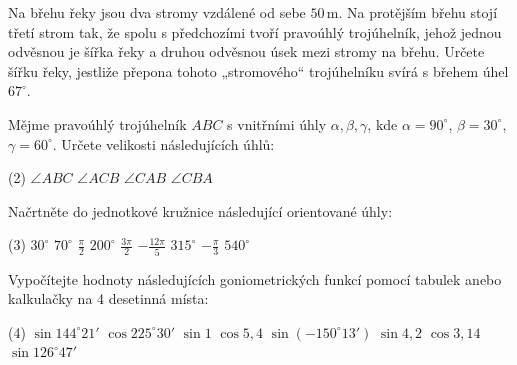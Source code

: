 \documentclass[12pt,a4paper]{article}
\begin{document}
\begin{exercise}
    Na břehu řeky jsou dva stromy vzdálené od sebe $50\,\text{m}$. 
    Na protějším břehu stojí třetí strom tak, že spolu s předchozími tvoří pravoúhlý trojúhelník, 
    jehož jednou odvěsnou je šířka řeky a druhou odvěsnou úsek mezi stromy na břehu. 
    Určete šířku řeky, jestliže přepona tohoto „stromového“ trojúhelníku svírá s břehem úhel $67^\circ$.
\end{exercise}


\begin{exercise}
Mějme pravoúhlý trojúhelník $ABC$ s vnitřními úhly $\alpha, \beta, \gamma$, kde
$\alpha = 90^\circ$, $\beta = 30^\circ$, $\gamma = 60^\circ$.
Určete velikosti následujících úhlů:
\begin{tasks}(2)
    \task $\angle ABC$
    \task $\angle ACB$
    \task $\angle CAB$
    \task $\angle CBA$
\end{tasks}
\end{exercise}


\begin{exercise}
Načrtněte do jednotkové kružnice následující orientované úhly:
\begin{tasks}(3)
    \task $30^\circ$
    \task $70^\circ$
    \task $\frac{\pi}{2}$
    \task $200^\circ$
    \task $\frac{3\pi}{2}$
    \task $-\frac{12\pi}{5}$
    \task $315^\circ$
    \task $-\frac{\pi}{3}$
    \task $540^\circ$
\end{tasks}
\end{exercise}


\begin{exercise}
Vypočítejte hodnoty následujících goniometrických funkcí pomocí tabulek anebo kalkulačky na 4 desetinná místa:
\begin{tasks}(4)
    \task $\sin 144^\circ21'$
    \task $\cos 225^\circ30'$
    \task $\sin 1$
    \task $\cos 5,4$
    \task $\sin(-150^\circ13')$
    \task $\sin 4,2$
    \task $\cos 3,14$
    \task $\sin 126^\circ47'$
\end{tasks}
\end{exercise} 
\end{document}
